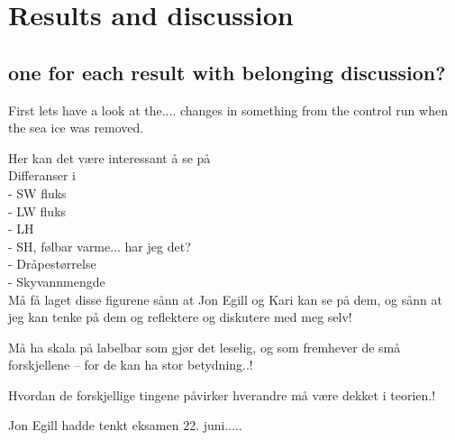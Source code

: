 \chapter{Results and discussion}
\label{chap:results}
\section{one for each result with belonging discussion?}
First lets have a look at the.... changes in something from the control run when the sea ice was removed.


Her kan det være interessant å se på\\
Differanser i\\
- SW fluks\\
- LW fluks\\
- LH \\
- SH, følbar varme... har jeg det?\\
- Dråpestørrelse\\
- Skyvannmengde\\

Må få laget disse figurene sånn at Jon Egill og Kari kan se på dem, og sånn at jeg kan tenke på dem og reflektere og diskutere med meg selv!

Må ha skala på labelbar som gjør det leselig, og som fremhever de små forskjellene -- for de kan ha stor betydning..!

Hvordan de forskjellige tingene påvirker hverandre må være dekket i teorien.!

Jon Egill hadde tenkt eksamen 22. juni.....